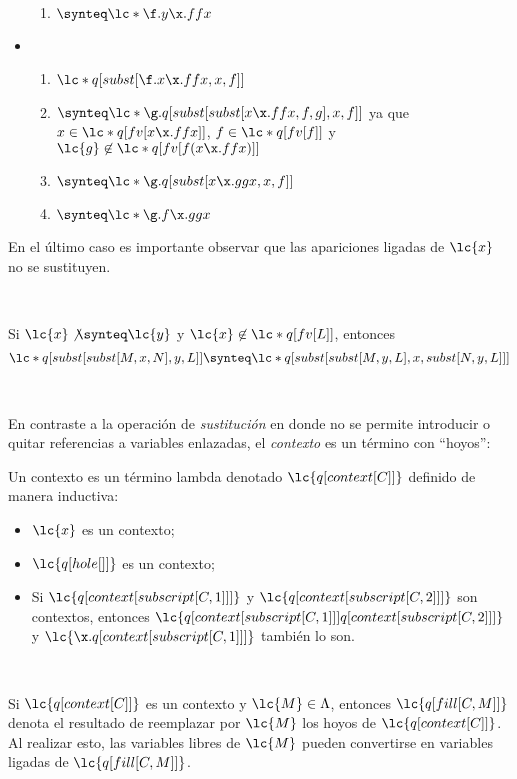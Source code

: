 \begin{ejemplo}
\begin{itemize}
\begin{enumerate}
    \item \(\synteq \lc*{\f.y\x.f f x}\)
    \end{enumerate}
  \item \begin{enumerate}
    \item \(\lc*{q[subst[\f.x\x.f f x, x, f]]}\)
    \item \(\synteq \lc*{\g.q[subst[subst[x\x.f f x, f, g], x, f]]}\) ya que \(x\in \lc*{q[fv[x\x.f f x]]}\), \(f\in \lc*{q[fv[f]]}\) y \(\lc{g}\not\in \lc*{q[fv[f (x\x.f f x)]]}\)
    \item \(\synteq \lc*{\g.q[subst[x\x.g g x, x, f]]}\)
    \item \(\synteq \lc*{\g.f\x.g g x}\)
    \end{enumerate}
  \end{itemize}

  En el último caso es importante observar que las apariciones ligadas de \(\lc{x}\) no se sustituyen.
\end{ejemplo} \

\begin{lema}
  Si \(\lc{x} \not\synteq \lc{y}\) y \(\lc{x}\not\in \lc*{q[fv[L]]}\), entonces
  \[\lc*{q[subst[subst[M,x,N],y,L]]} \synteq \lc*{q[subst[subst[M,y,L],x,subst[N,y,L]]]}\]
\end{lema} \

En contraste a la operación de \emph{sustitución} en donde no se permite introducir o quitar referencias a variables enlazadas, el \emph{contexto} es un término con ``hoyos'': \\

\begin{defi}[Contexto] Un contexto es un término lambda denotado \(\lc{q[context[C]]}\) definido de manera inductiva:
  \label{definicion:contexto}
  \begin{itemize}
  \item \(\lc{x}\) es un contexto;
  \item \(\lc{q[hole[]]}\) es un contexto;
  \item Si \(\lc{q[context[subscript[C,1]]]}\) y
    \(\lc{q[context[subscript[C,2]]]}\) son contextos, entonces
    \(\lc{q[context[subscript[C,1]]] q[context[subscript[C,2]]]}\) y
    \(\lc{\x.q[context[subscript[C,1]]]}\) también lo son.
  \end{itemize}
\end{defi} \

Si \(\lc{q[context[C]]}\) es un contexto y \(\lc{M} \in \Lambda\), entonces \(\lc{q[fill[C,M]]}\) denota el resultado de reemplazar por \(\lc{M}\) los hoyos de \(\lc{q[context[C]]}\). Al realizar esto, las variables libres de \(\lc{M}\) pueden convertirse en variables ligadas de \(\lc{q[fill[C,M]]}\). \\

